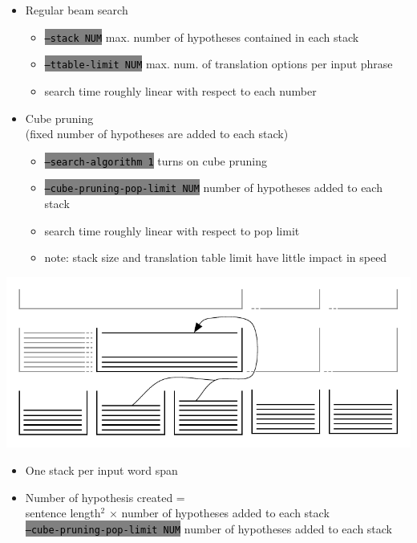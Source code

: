 \documentclass[landscape]{uedslides2C}
\newcommand{\littlecode}[1]{\colorbox{gray}{\textcolor{black}{\small \tt #1}}}
\begin{document}

\begin{itemize}
\item Regular beam search
\begin{itemize}
\item \littlecode{--stack NUM} max. number of hypotheses contained in each stack
\item \littlecode{--ttable-limit NUM} max. num. of translation options per input phrase
\vspace{2mm}
\item search time roughly linear with respect to each number
\end{itemize}
\item Cube pruning\\
(fixed number of hypotheses are added to each stack)
\begin{itemize}
\item \littlecode{--search-algorithm 1} turns on cube pruning
\item \littlecode{--cube-pruning-pop-limit NUM} number of hypotheses added to each stack
\vspace{2mm}
\item search time roughly linear with respect to pop limit
\vspace{2mm}
\item note: stack size and translation table limit have little impact in speed
\end{itemize}
\end{itemize}



\begin{center} 
\includegraphics[scale=1.5]{chart-stacks.pdf}
\end{center}
\vspace{-5mm}
\begin{itemize} \itemsep -2mm
\item One stack per input word span
\item Number of hypothesis created = \\
sentence length$^2$ $\times$  number of hypotheses added to each stack\\
\littlecode{--cube-pruning-pop-limit NUM} number of hypotheses added to each stack
\end{itemize}
\end{document}
